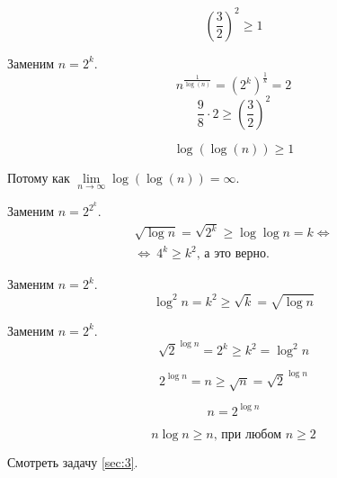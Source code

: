 	\begin{proposition}
		\label{p1}
		$$\left(\frac{3}{2}\right)^2 \geq 1$$
	\end{proposition}

	\begin{proposition}
		\label{p2}
		Заменим $n = 2^k$.
		$$ n^{\frac{1}{\log(n)}} = \left(2^k\right)^{\frac{1}{k}} = 2$$
		$$ \frac{9}{8} \cdot 2 \geq \left(\frac{3}{2}\right)^2$$
	\end{proposition}

	\begin{proposition}
		\label{p3}
		$$\log(\log(n)) \geq 1$$
		\begin{center}Потому как $\lim\limits_{n \rightarrow \infty}\log(\log(n)) = \infty$.\end{center}
	\end{proposition}

	\begin{proposition}
		\label{p4}
		Заменим $n = 2^{2^k}$.
		\begin{align*}
		 \sqrt{\log n} = \sqrt{2^k} \geq \log\log n = k \Leftrightarrow\\
		 \Leftrightarrow \: 4^k \geq k^2\text{, а это верно.}
		\end{align*}
	\end{proposition}
	
	\begin{proposition}
		\label{p5}
		Заменим $n = 2^k$.
		$$\log^2n = k^2 \geq \sqrt{k} = \sqrt{\log n} $$
	\end{proposition}
	
	\begin{proposition}
		\label{p6}
		Заменим $n = 2^k$.
		$$\sqrt{2}^{\log n} = 2^k \geq k^2 = \log^2n$$
	\end{proposition}

	\begin{proposition}
		\label{p7}
		$$2^{\log n} = n \geq \sqrt{n} = \sqrt{2}^{\log n}$$
	\end{proposition}
	
	\begin{proposition}
		\label{p8}
		$$n = 2^{\log n}$$
	\end{proposition}
	
	\begin{proposition}
		\label{p9}
		$$n\log n \geq n\text{, при любом } n \geq 2$$
	\end{proposition}
	
	\begin{proposition}
		\label{p10}
		Смотреть задачу \ref{sec:3}.
	\end{proposition}
	
